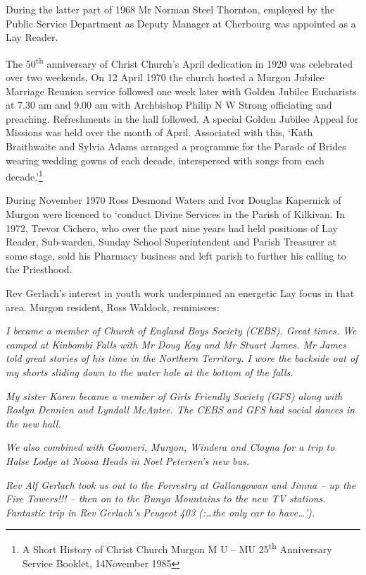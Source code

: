During the latter part of 1968 Mr Norman Steel Thornton, employed by the Public Service Department as Deputy Manager at Cherbourg was appointed as a Lay Reader.

The 50\textsuperscript{th} anniversary of Christ Church's April dedication in 1920 was celebrated over two weekends. On 12 April 1970 the church hosted a Murgon Jubilee Marriage Reunion service followed one week later with Golden Jubilee Eucharists at 7.30 am and 9.00 am with Archbishop Philip N W Strong officiating and preaching. Refreshments in the hall followed. A special Golden Jubilee Appeal for Missions was held over the month of April. Associated with this, `Kath Braithwaite and Sylvia Adams arranged a programme for the Parade of Brides wearing wedding gowns of each decade, interspersed with songs from each decade.'\footnote{A Short History of Christ Church Murgon M U -- MU 25\textsuperscript{th} Anniversary Service Booklet, 14November 1985}

During November 1970 Ross Desmond Waters and Ivor Douglas Kapernick of Murgon were licenced to `conduct Divine Services in the Parish of Kilkivan. In 1972, Trevor Cichero, who over the past nine years had held positions of Lay Reader, Sub-warden, Sunday School Superintendent and Parish Treasurer at some stage, sold his Pharmacy business and left parish to further his calling to the Priesthood.

Rev Gerlach's interest in youth work underpinned an energetic Lay focus in that area. Murgon resident, Ross Waldock, reminisces:

\emph{I became a member of Church of England Boys Society (CEBS). Great times. We camped at Kinbombi Falls with Mr Doug Kay and Mr Stuart James. Mr James told great stories of his time in the Northern Territory. I wore the backside out of my shorts sliding down to the water hole at the bottom of the falls.}

\emph{My sister Karen became a member of Girls Friendly Society (GFS) along with Roslyn Dennien and Lyndall McAntee. The CEBS and GFS had social dances in the new hall.}

\emph{We also combined with Goomeri, Murgon, Windera and Cloyna for a trip to Halse Lodge at Noosa Heads in Noel Petersen's new bus.}

\emph{Rev Alf Gerlach took us out to the Forrestry at Gallangowan and Jimna -- up the Fire Towers!!! -- then on to the Bunya Mountains to the new TV stations. Fantastic trip in Rev Gerlach's Peugeot 403 (:\ldots the only car to have\ldots').}

